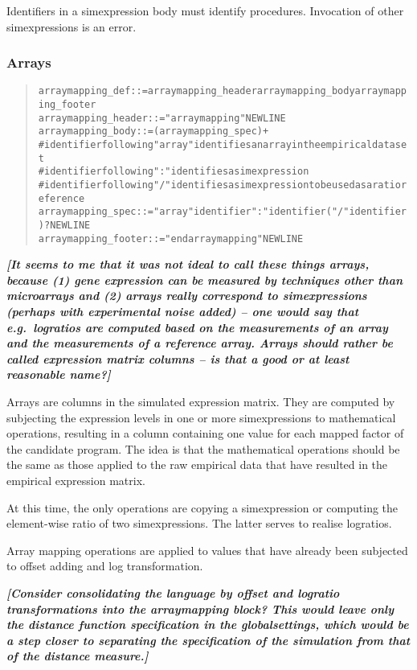 \documentclass[a4paper,fleqn]{article}
\newcommand{\todo}[1]{\rule{0pt}{0pt}\marginpar{\rule{1ex}{1ex}}\textbf{\emph{[#1]}}}
\newenvironment{ebnfrule}{\begin{footnotesize}\begin{quote}\begin{alltt}}{\end{alltt}\end{quote}\end{footnotesize}}
\begin{document}
Identifiers in a simexpression body must identify
procedures. Invocation of other simexpressions is an error.


\subsubsection{Arrays}

\begin{ebnfrule}
arraymapping_def ::= arraymapping_header arraymapping_body arraymapping_footer
arraymapping_header ::= "arraymapping" NEWLINE
arraymapping_body ::= (arraymapping_spec)+
# identifier following "array" identifies an array in the empirical data set
# identifier following ":" identifies a simexpression
# identifier following "/" identifies a simexpression to be used as a ratio reference
arraymapping_spec ::= "array" identifier ":" identifier ( "/" identifier)? NEWLINE
arraymapping_footer ::= "endarraymapping" NEWLINE
\end{ebnfrule}

\todo{It seems to me that it was not ideal to call these things
  arrays, because (1) gene expression can be measured by techniques
  other than microarrays and (2) arrays really correspond to
  simexpressions (perhaps with experimental noise added) -- one would
  say that e.g.\ logratios are computed based on the measurements of
  an array and the measurements of a reference array. Arrays should
  rather be called expression matrix columns -- is that a good or at
  least reasonable name?}

Arrays are columns in the simulated expression matrix. They are
computed by subjecting the expression levels in one or more
simexpressions to mathematical operations, resulting in a column
containing one value for each mapped factor of the candidate program.
The idea is that the mathematical operations should be the same as
those applied to the raw empirical data that have resulted in the
empirical expression matrix.

At this time, the only operations are copying a simexpression or
computing the element-wise ratio of two simexpressions. The latter
serves to realise logratios.

Array mapping operations are applied to values that have already been
subjected to offset adding and log transformation.

\todo{Consider consolidating the language by offset and logratio
  transformations into the arraymapping block? This would leave only
  the distance function specification in the globalsettings, which
  would be a step closer to separating the specification of the
  simulation from that of the distance measure.}
\cite{Parkinson2009}
\end{document}
